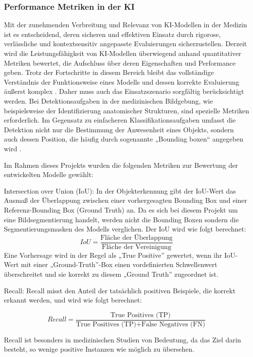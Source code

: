 \documentclass[
	german,
	accentcolor=10c,%
	type=intern,
	marginpar=false
	]{tudapub}
\begin{document}
\subsubsection{Performance Metriken in der KI}
Mit der zunehmenden Verbreitung und Relevanz von KI-Modellen in der Medizin ist es entscheidend, deren sicheren und effektiven Einsatz durch rigorose, verlässliche und kontextsensitiv angepasste Evaluierungen sicherzustellen.
Derzeit wird die Leistungsfähigkeit von KI-Modellen überwiegend anhand quantitativer Metriken bewertet, die Aufschluss über deren Eigenschaften und Performance geben. Trotz der Fortschritte in diesem Bereich bleibt das vollständige Verständnis der Funktionsweise eines Modells und dessen korrekte Evaluierung äußerst komplex \cite{ref7,ref8} . Daher muss auch das Einsatzszenario sorgfältig berücksichtigt werden. Bei Detektionsaufgaben in der medizinischen Bildgebung, wie beispielsweise der Identifizierung anatomischer Strukturen, sind spezielle Metriken erforderlich. Im Gegensatz zu einfacheren Klassifikationsaufgaben umfasst die Detektion nicht nur die Bestimmung der Anwesenheit eines Objekts, sondern auch dessen Position, die häufig durch sogenannte „Bounding boxen“ angegeben wird \cite{ref7}.

Im Rahmen dieses Projekts wurden die folgenden Metriken zur Bewertung der entwickelten Modelle gewählt:

Intersection over Union (IoU): In der Objekterkennung gibt der IoU-Wert das Ausmaß der Überlappung zwischen einer vorhergesagten Bounding Box und einer Referenz-Bounding Box (Ground Truth) an. Da es sich bei diesem Projekt um eine Bildsegmentierung handelt, werden nicht die Bounding Boxen sondern die Segmentierungsmasken des Modells verglichen. Der IoU wird wie folgt berechnet:
\[
IoU = \frac{\text{Fläche der Überlappung}}{\text{Fläche der Vereinigung}}
\]
Eine Vorhersage wird in der Regel als „True Positive” gewertet, wenn ihr IoU-Wert mit einer „Ground-Truth”-Box einen vordefinierten Schwellenwert überschreitet und sie korrekt zu diesem „Ground Truth” zugeordnet ist.

Recall: Recall misst den Anteil der tatsächlich positiven Beispiele, die korrekt erkannt werden, und wird wie folgt berechnet:

\[
Recall = \frac{\text{True Positives (TP)}}{\text{True Positives (TP)} + \text{False Negatives (FN)}}
\]

Recall ist besonders in medizinischen Studien von Bedeutung, da das Ziel darin besteht, so wenige positive Instanzen wie möglich zu übersehen.
\end{document}
